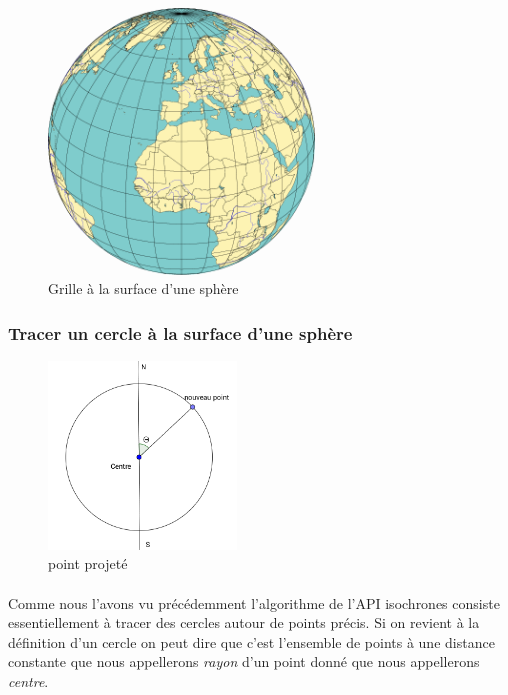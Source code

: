 \documentclass[a4paper]{report}
\begin{document}
\begin{figure}[H]
	\begin{center}
		\includegraphics[width=200pt]{image/grille_sphere}
		\caption{Grille à la surface d'une sphère}
		\label{Grille à la surface d'une sphère}
	\end{center}
\end{figure}

\subsubsection{Tracer un cercle à la surface d'une sphère}

\begin{figure}
		\includegraphics[width=5cm]{image/proj}
		\caption{point projeté}
		\label{point projeté}
\end{figure}

\paragraph{} Comme nous l'avons vu précédemment l'algorithme de l'API isochrones consiste essentiellement à tracer des cercles autour de points précis. Si on revient à la définition d'un cercle on peut dire que c'est l'ensemble de points à une distance constante que nous appellerons \emph{rayon} d'un point donné que nous appellerons \emph{centre}.
\end{document}
